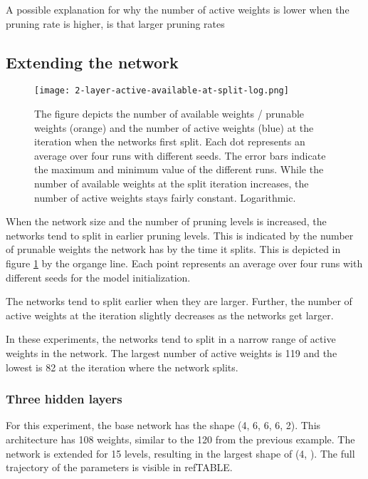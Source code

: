 A possible explanation for why the number of active weights is lower when the pruning rate is higher, is that larger pruning rates 


\subsection{Extending the network}

\begin{figure}[ht]
    \centering
    \texttt{[image: 2-layer-active-available-at-split-log.png]}
    \caption{
        The figure depicts the number of available weights / prunable weights (orange) and the number of active weights (blue) at the iteration when the networks first split.
        Each dot represents an average over four runs with different seeds.
        The error bars indicate the maximum and minimum value of the different runs.
        While the number of available weights at the split iteration increases, the number of active weights stays fairly constant.
        Logarithmic.
    }
    \label{fig:active-split}
\end{figure}

When the network size and the number of pruning levels is increased, the networks tend to split in earlier pruning levels.
This is indicated by the number of prunable weights the network has by the time it splits.
This is depicted in figure \ref{fig:active-split} by the organge line. 
Each point represents an average over four runs with different seeds for the model initialization. 

The networks tend to split earlier when they are larger.
Further, the number of active weights at the iteration slightly decreases as the networks get larger.

In these experiments, the networks tend to split in a narrow range of active weights in the network.
The largest number of active weights is 119 and the lowest is 82 at the iteration where the network splits.

\subsubsection{Three hidden layers}
For this experiment, the base network has the shape (4, 6, 6, 6, 2).
This architecture has 108 weights, similar to the 120 from the previous example.
The network is extended for 15 levels, resulting in the largest shape of (4, ).
The full trajectory of the parameters is visible in refTABLE.

